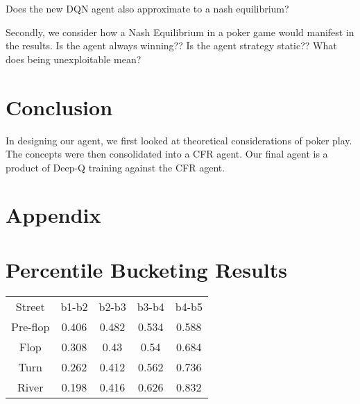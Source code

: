 \documentclass{article}
\begin{document}
 Does the new DQN agent also approximate to a nash equilibrium?

Secondly, we consider how a Nash Equilibrium in a poker game would manifest in the results. Is the agent always winning?? Is the agent strategy static?? What does being unexploitable mean?

\section{Conclusion}

In designing our agent, we first looked at theoretical considerations of poker play. The concepts were then consolidated into a CFR agent. Our final agent is a product of Deep-Q training against the CFR agent.



\iffalse
@article{ todd:cfr,
  author = "Todd W. Neller and Marc Lanctot"
  title = "An Introduction to Counterfactual Regret Minimization",
  month = "July",
  year = "2013"
}


@article{ yako:dqn,
	author = "Nikolai Yakovenko, Liangliang Cao, Colin Raffel and James Fan",
	title = "Poker-CNN: A Pattern Learning Strategy for Making Draws and Bets in Poker Games",
	journal = "Association for the Advancement of Artificial
Intelligence",
	month = "September",
	year = 2015
}

@article{ samz:tartarian,
	author = "Sam Ganzfried and Tuomas Sandholm",
	title = "Tartanian5: A Heads-Up No-Limit Texas Hold’em Poker-Playing Program",
	journal = "Association for the Advancement of Artificial
Intelligence",
	year = "2012"
}

@article{ michael:guide,
	author = "Michael Bradley Johanson",
	title = "Robust Strategies and Counter-Strategies: Building a Champion Level Computer Poker Player",
	journal = "University of Alberta Library"
	year = "2007"
}
\fi
\appendix
\section{Appendix}

\section{Percentile Bucketing Results}
\begin{center}
\begin{tabular}{ c c c c c }
Street & b1-b2 & b2-b3 & b3-b4 & b4-b5\\
Pre-flop & 0.406 & 0.482 & 0.534 & 0.588\\ 
Flop & 0.308 & 0.43 & 0.54 & 0.684\\
Turn & 0.262 & 0.412 & 0.562 & 0.736\\
River & 0.198 & 0.416 & 0.626 & 0.832
\end{tabular}
\end{center}
\end{document}
